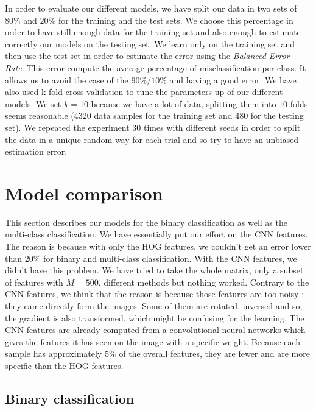 \documentclass{article} %
\begin{document}
In order to evaluate our different models, we have split our data in two sets of $80\%$ and $20\%$ for the training and the test sets. We choose this percentage in order to have still enough data for the training set and also enough to estimate correctly our models on the testing set. We learn only on the training set and then use the test set in order to estimate the error using the \textit{Balanced Error Rate}. This error compute the average percentage of misclassification per class. It allows us to avoid the case of the $90\%/10\%$ and having a good error. We have also used k-fold cross validation to tune the parameters up of our different models. We set $k=10$ because we have a lot of data, splitting them into $10$ folds seems reasonable ($4320$ data samples for the training set and $480$ for the testing set). We repeated the experiment $30$ times with different seeds in order to split the data in a unique random way for each trial and so try to have an unbiased estimation error. 

\section{Model comparison}

This section describes our models for the binary classification as well as the multi-class classification. We have essentially put our effort on the CNN features. The reason is because with only the HOG features, we couldn't get an error lower than $20\%$ for binary and multi-class classification. With the CNN features, we didn't have this problem. We have tried to take the whole matrix, only a subset of features with $M = 500$, different methods but nothing worked. Contrary to the CNN features, we think that the reason is because those features are too noisy : they came directly form the images. Some of them are rotated, inversed and so, the gradient is also transformed, which might be confusing for the learning. The CNN features are already computed from a convolutional neural networks which gives the features it has seen on the image with a specific weight. Because each sample has approximately $5\%$ of the overall features, they are fewer and are more specific than the HOG features.

\subsection{Binary classification}
\end{document}
